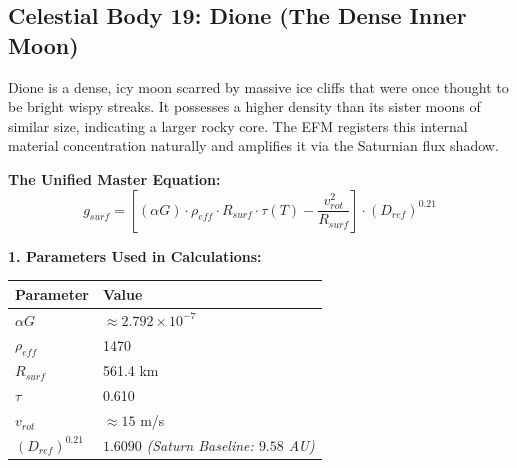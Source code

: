 \documentclass[11pt, a4paper]{article}
\begin{document}
\clearpage
\subsection{Celestial Body 19: Dione (The Dense Inner Moon)}
  Dione is a dense, icy moon scarred by massive ice cliffs that were once thought to be bright wispy streaks. It possesses a higher density than its sister moons of similar size, indicating a larger rocky core. The EFM registers this internal material concentration naturally and amplifies it via the Saturnian flux shadow.

  \vspace{0.5em}
  \noindent \textbf{The Unified Master Equation:}
  $$ g_{surf} = \left[ (\alpha G) \cdot \rho_{eff} \cdot R_{surf} \cdot \tau(T) - \frac{v_{rot}^2}{R_{surf}} \right] \cdot (D_{ref})^{0.21} $$

  \vspace{0.5em}
  \noindent \textbf{1. Parameters Used in Calculations:} \\[0.5em]
  \begingroup
  \renewcommand{\arraystretch}{1.3}
  \hspace*{2em}
  \begin{tabular}{|l|l|}
    \hline
    \textbf{Parameter} & \textbf{Value} \\ \hline
    $\alpha G$ & $\approx 2.792 \times 10^{-7}$ \\ \hline
    $\rho_{eff}$ & 1470 \\ \hline
    $R_{surf}$ & 561.4 km \\ \hline
    $\tau$ & 0.610 \\ \hline
    $v_{rot}$ & $\approx 15$ m/s \\ \hline
    $(D_{ref})^{0.21}$ & $1.6090$ \textit{(Saturn Baseline: $9.58$ AU)} \\ \hline
  \end{tabular}
  \endgroup
\end{document}
